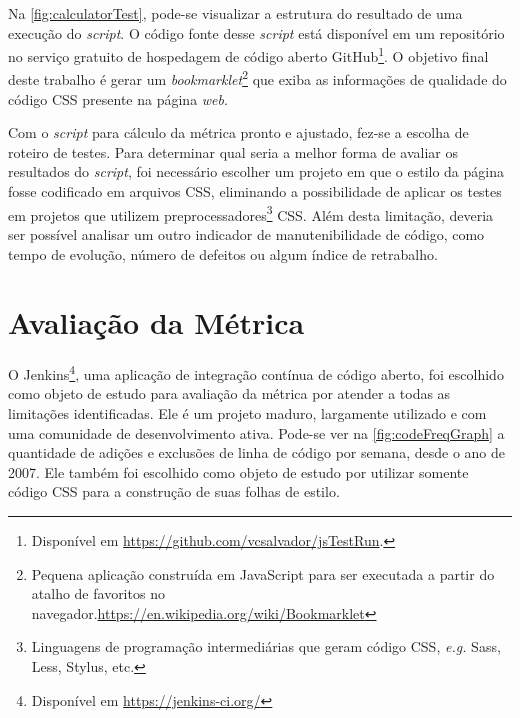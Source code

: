 Na \autoref{fig:calculatorTest}, pode-se visualizar a estrutura do resultado de uma execução do \textit{script}. O código fonte desse \textit{script} está disponível em um repositório no serviço gratuito de hospedagem de código aberto GitHub\footnote{Disponível em \url{https://github.com/vcsalvador/jsTestRun}.}. O objetivo final deste trabalho é gerar um \textit{bookmarklet}\footnote{Pequena aplicação construída em JavaScript para ser executada a partir do atalho de favoritos no navegador.\url{https://en.wikipedia.org/wiki/Bookmarklet}} que exiba as informações de qualidade do código CSS presente na página \textit{web}.

Com o \textit{script} para cálculo da métrica pronto e ajustado, fez-se a escolha de roteiro de testes. Para determinar qual seria a melhor forma de avaliar os resultados do \textit{script}, foi necessário escolher um projeto em que o estilo da página fosse codificado em arquivos CSS, eliminando a possibilidade de aplicar os testes em projetos que utilizem preprocessadores\footnote{Linguagens de programação intermediárias que geram código CSS, \textit{e.g.} Sass, Less, Stylus, etc.} CSS. Além desta limitação, deveria ser possível analisar um outro indicador de manutenibilidade de código, como tempo de evolução, número de defeitos ou algum índice de retrabalho.

\chapter{Avaliação da Métrica}

O Jenkins\footnote{Disponível em \url{https://jenkins-ci.org/}}, uma aplicação de integração contínua de código aberto, foi escolhido como objeto de estudo para avaliação da métrica por atender a todas as limitações identificadas. Ele é um projeto maduro, largamente utilizado e com uma comunidade de desenvolvimento ativa. Pode-se ver na \autoref{fig:codeFreqGraph} a quantidade de adições e exclusões de linha de código por semana, desde o ano de 2007. Ele também foi escolhido como objeto de estudo por utilizar somente código CSS para a construção de suas folhas de estilo.


